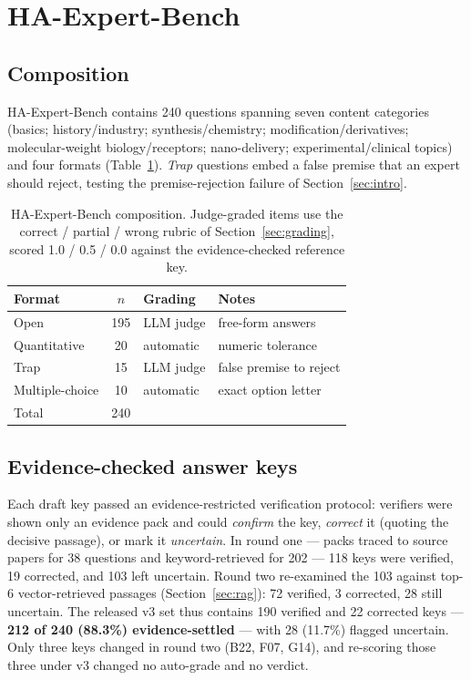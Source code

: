 \documentclass[11pt]{article}
\begin{document}
\section{HA-Expert-Bench}
\label{sec:bench}

\subsection{Composition}

HA-Expert-Bench contains 240 questions spanning seven content
categories (basics; history/industry; synthesis/chemistry;
modification/derivatives; molecular-weight biology/receptors;
nano-delivery; experimental/clinical topics) and four formats
(Table~\ref{tab:benchcomp}). \emph{Trap} questions embed a false
premise that an expert should reject, testing the premise-rejection
failure of Section~\ref{sec:intro}.

\begin{table}[t]
\centering
\begin{tabular}{lcll}
\toprule
Format & $n$ & Grading & Notes \\
\midrule
Open & 195 & LLM judge & free-form answers \\
Quantitative & 20 & automatic & numeric tolerance \\
Trap & 15 & LLM judge & false premise to reject \\
Multiple-choice & 10 & automatic & exact option letter \\
\midrule
Total & 240 & & \\
\bottomrule
\end{tabular}
\caption{HA-Expert-Bench composition. Judge-graded items use the
correct / partial / wrong rubric of Section~\ref{sec:grading}, scored
1.0 / 0.5 / 0.0 against the evidence-checked reference key.}
\label{tab:benchcomp}
\end{table}

\subsection{Evidence-checked answer keys}
\label{sec:keys}

Each draft key passed an evidence-restricted verification protocol:
verifiers were shown only an evidence pack and could \emph{confirm}
the key, \emph{correct} it (quoting the decisive passage), or mark it
\emph{uncertain}. In round one --- packs traced to source papers for
38 questions and keyword-retrieved for 202 --- 118 keys were verified,
19 corrected, and 103 left uncertain. Round two re-examined the 103
against top-6 vector-retrieved passages (Section~\ref{sec:rag}): 72
verified, 3 corrected, 28 still uncertain. The released v3 set thus
contains 190 verified and 22 corrected keys --- \textbf{212 of 240
(88.3\%) evidence-settled} --- with 28 (11.7\%) flagged uncertain. Only
three keys changed in round two (B22, F07, G14), and re-scoring those
three under v3 changed no auto-grade and no verdict.
\end{document}
